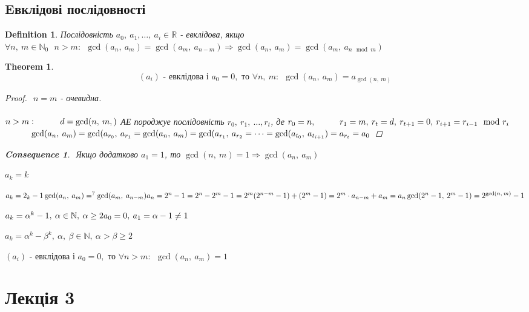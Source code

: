 \documentclass[a4paper,12pt]{bookest}
\newtheorem{theorem}{Theorem}[section]
\newtheorem{definition}{Definition}[section]
\newtheorem*{cons*}{Consequence}
\newcommand\tab[1][1cm]{\hspace*{#1}}
\begin{document}
\section{Eвклідові послідовності}
\begin{definition}
Послідовність $a_0,\>a_1,\dots,\>a_i\in\mathbb{R}$ - евклідова, якщо $\forall n,\>m\in\mathbb{N}_0\
\>\>n>m:\>\>\gcd(a_n,\>a_m)=\gcd(a_m,\>a_{n-m})\Rightarrow\gcd(a_n,\>a_m)=\gcd(a_m,\>a_{n\mod m})$	
\end{definition}
\begin{theorem}
	$$(a_i)\textrm{ - евклідова і } a_0=0,\textrm{ то }\forall n,\>m:\>\>\gcd(a_n,\>a_m)=a_{\gcd(n,\>m)}$$
	\begin{proof}$ $
		$n=m$ - очевидна.\\\\
		$n>m:\\\tab d=\gcd(n,\>m,)$ АЕ породжуе послідовність $r_0,\>r_1,\>\dots,r_t$, де $r_0=n,\\\tab r_1=m,\>r_t=d,\>r_{t+1}=0,\>r_{i+1}=r_{i-1}\mod r_i$ $\\\tab \gcd(a_n,\>a_m)=\gcd(a_{r_0},\>a_{r_1}=\gcd(a_n,\>a_m)=\gcd(a_{r_1},\>a_{r_2}=\dots=\gcd(a_{t_0},\>a_{t_{i+1}})=a_{r_t}=a_0$
	\end{proof}
	\begin{cons*}$ $
		Якщо додатково $a_1=1$, то $\gcd(n,\>m)=1\Rightarrow\gcd(a_n,\>a_m)$
	\end{cons*}
\end{theorem}
\begin{example}
	$a_k=k$	
\end{example}
\begin{example}
	$a_k=2_k-1\\\gcd(a_n,\>a_m)=^{?}\gcd(a_m,\>a_{n-m})\\a_n=2^n-1=2^n-2^m-1=2^m(2^{n-m}-1)+(2^m-1)=2^m\cdot a_{n-m}+a_m=a_n\\\gcd(2^n-1,\>2^m-1)=2^{\gcd(n,\>m)}-1$	
\end{example}
\begin{example}
	$a_k=\alpha^k-1,\>\alpha\in\mathbb{N},\>\alpha\geq 2\\a_0=0,\>a_1=\alpha-1\neq 1$	
\end{example}
\begin{example}
	$a_k=\alpha^k-\beta^k,\>\alpha,\>\beta\in\mathbb{N},\>\alpha>\beta\geq 2$	
\end{example}
$(a_i)\textrm{ - евклідова і } a_0=0,\textrm{ то }\forall n>m:\>\>\gcd(a_n,\>a_m)=1$
\let\cleardoublepage\clearpage
\chapter{Лекція 3}
\end{document}

